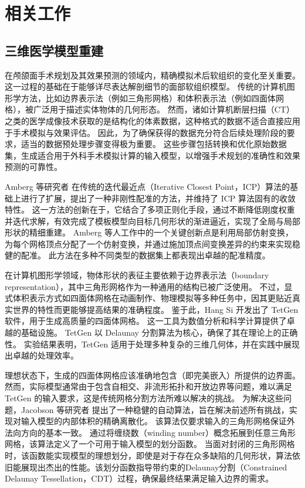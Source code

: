 
\chapter{相关工作}
\label{cha:related-work}

\section{三维医学模型重建}

在颅颌面手术规划及其效果预测的领域内，精确模拟术后软组织的变化至关重要。
这一过程的基础在于能够详尽表达解剖细节的面部软组织模型。
传统的计算机图形学方法，比如边界表示法（例如三角形网格）和体积表示法（例如四面体网格），被广泛用于描述实体物体的几何形态。
然而，诸如计算机断层扫描（CT）之类的医学成像技术获取的是结构化的体素数据，这种格式的数据不适合直接应用于手术模拟与效果评估。
因此，为了确保获得的数据充分符合后续处理阶段的要求，适当的数据预处理步骤变得极为重要。
这些步骤包括转换和优化原始数据集，生成适合用于外科手术模拟计算的输入模型，以增强手术规划的准确性和效果预测的可靠性。

Amberg 等研究者 \cite{ambergOptimalStepNonrigid2007} 在传统的迭代最近点（Iterative Closest Point，ICP）算法的基础上进行了扩展，提出了一种非刚性配准的方法，并维持了 ICP 算法固有的收敛特性。
这一方法的创新在于，它结合了多项正则化手段，通过不断降低刚度权重并迭代求解，有效完成了模板模型向目标几何形状的渐进逼近，实现了全局与局部形状的精细重建。
Amberg 等人工作中的一个关键创新点是利用局部仿射变换，为每个网格顶点分配了一个仿射变换，并通过施加顶点间变换差异的约束来实现稳健的配准。
此方法在多种不同类型的数据集上都表现出卓越的配准精度。

在计算机图形学领域，物体形状的表征主要依赖于边界表示法（boundary representation），其中三角形网格作为一种通用的结构已被广泛使用。
不过，显式体积表示方式如四面体网格在动画制作、物理模拟等多种任务中，因其更贴近真实世界的特性而更能够提高结果的准确程度。
鉴于此，Hang Si \cite{siTetGenDelaunaybasedQuality2015} 开发出了 TetGen 软件，用于生成高质量的四面体网格。
这一工具为数值分析和科学计算提供了卓越的基础设施。
TetGen 以 Delaunay 分割算法为核心，确保了其在理论上的正确性。
实验结果表明，TetGen 适用于处理多种复杂的三维几何体，并在实践中展现出卓越的处理效率。

理想状态下，生成的四面体网格应该准确地包含（即完美嵌入）所提供的边界面。
然而，实际模型通常由于包含自相交、非流形拓扑和开放边界等问题，难以满足 TetGen 的输入要求，这是传统网格分割方法所难以解决的挑战。
为解决这些问题，Jacobson 等研究者 \cite{jacobsonRobustInsideoutsideSegmentation2013} 提出了一种稳健的自动算法，旨在解决前述所有挑战，实现对输入模型的内部体积的精确离散化。
该算法仅要求输入的三角形网格保证外法向方向的基本一致。
通过将缠绕数（winding number）概念拓展到任意三角形网格，该算法定义了一个可用于输入模型的划分函数。
当面对封闭的三角形网格时，该函数能实现模型的理想划分，即使是对于存在众多缺陷的几何形状，算法依旧能展现出杰出的性能。该划分函数指导带约束的Delaunay分割（Constrained Delaunay Tessellation，CDT）过程，确保最终结果满足输入边界的需求。

